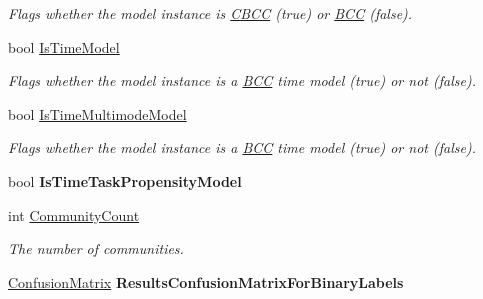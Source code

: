 \begin{DoxyCompactItemize}
\begin{DoxyCompactList}\small\item\em Flags whether the model instance is \hyperlink{class_crowdsourcing_models_1_1_c_b_c_c}{C\+B\+C\+C} (true) or \hyperlink{class_crowdsourcing_models_1_1_b_c_c}{B\+C\+C} (false). \end{DoxyCompactList}\item 
bool \hyperlink{class_crowdsourcing_models_1_1_results_a9b530081d9a4d406f071c7a3e8e3fb71}{Is\+Time\+Model}
\begin{DoxyCompactList}\small\item\em Flags whether the model instance is a \hyperlink{class_crowdsourcing_models_1_1_b_c_c}{B\+C\+C} time model (true) or not (false). \end{DoxyCompactList}\item 
bool \hyperlink{class_crowdsourcing_models_1_1_results_a0ddff489da9fc4daab54d8fcc7163acb}{Is\+Time\+Multimode\+Model}
\begin{DoxyCompactList}\small\item\em Flags whether the model instance is a \hyperlink{class_crowdsourcing_models_1_1_b_c_c}{B\+C\+C} time model (true) or not (false). \end{DoxyCompactList}\item 
\hypertarget{class_crowdsourcing_models_1_1_results_a73c4db10877ad67456a71f60dc687188}{}bool {\bfseries Is\+Time\+Task\+Propensity\+Model}\label{class_crowdsourcing_models_1_1_results_a73c4db10877ad67456a71f60dc687188}

\item 
int \hyperlink{class_crowdsourcing_models_1_1_results_a90fd0653bd49b69cc9f12ad7cfb3fa9c}{Community\+Count}
\begin{DoxyCompactList}\small\item\em The number of communities. \end{DoxyCompactList}\item 
\hypertarget{class_crowdsourcing_models_1_1_results_ab48ec731c1dcda12ec18ee13e17ac818}{}\hyperlink{class_crowdsourcing_project_1_1_statistics_1_1_confusion_matrix}{Confusion\+Matrix} {\bfseries Results\+Confusion\+Matrix\+For\+Binary\+Labels}\label{class_crowdsourcing_models_1_1_results_ab48ec731c1dcda12ec18ee13e17ac818}


\end{DoxyCompactItemize}
